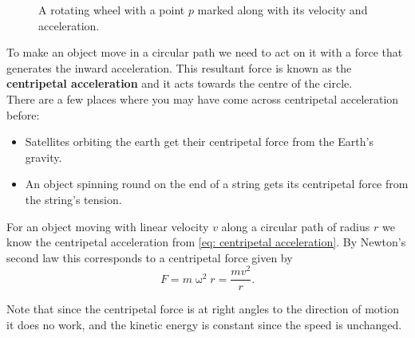 \documentclass[a4paper,12pt]{book}
\begin{document}
\begin{figure}[ht]
    \centering
    \caption{A rotating wheel with a point $p$ marked along with its velocity and acceleration.}
        \label{fig: pt on a wheel 2}
\end{figure}


To make an object move in a circular path we need to act on it with a force that generates the inward acceleration. This resultant force is known as the \textbf{centripetal acceleration} and it acts towards the centre of the circle.\\

There are a few places where you may have come across centripetal acceleration before:
\begin{itemize}
\setlength{\itemsep}{-5pt}
    \item Satellites orbiting the earth get their centripetal force from the Earth's gravity.
    \item An object spinning round on the end of a string gets its centripetal force from the string's tension.
\end{itemize} 

For an object moving with linear velocity $v$ along a circular path of radius $r$ we know the centripetal acceleration from \cref{eq: centripetal acceleration}. By Newton's second law this corresponds to a centripetal force given by
\begin{equation}
F=m\upomega^{2}r=\frac{mv^{2}}{r}.
\label{eq: centripetal force}
\end{equation}

Note that since the centripetal force is at right angles to the direction of motion it does no work, and the kinetic energy is constant since the speed is unchanged.
\end{document}
